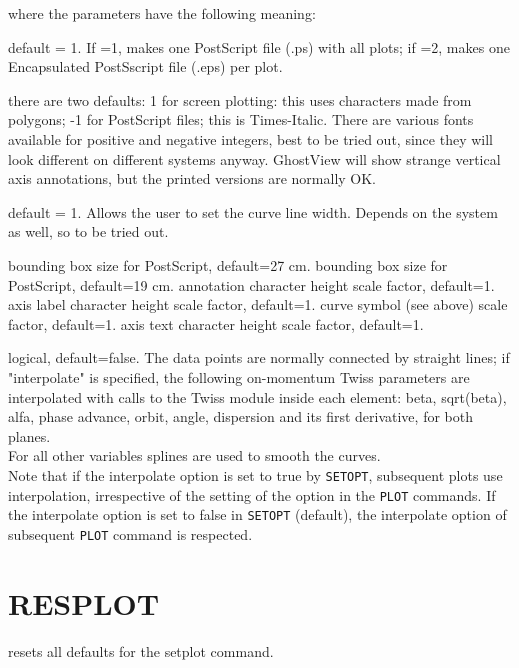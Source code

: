 where the parameters have the following meaning: 
\begin{madlist}
    default = 1. If =1, makes one PostScript file (.ps) with
     all plots; if =2, makes one Encapsulated PostSscript file (.eps)
     per plot.   

    there are two defaults: 1 for screen plotting: this uses
     characters made from polygons; -1 for PostScript files; this is
     Times-Italic. There are various fonts available for positive and
     negative integers, best to be tried out, since they will look
     different on different systems anyway. GhostView will show strange
     vertical axis annotations, but the printed versions are normally
     OK.   

    default = 1. Allows the user to set the curve line
     width.  Depends on the system as well, so to be tried out.   

    bounding box size for PostScript, default=27 cm.   
    bounding box size for PostScript, default=19 cm.   
    annotation character height scale factor, default=1.   
    axis label character height scale factor, default=1.  
    curve symbol (see above) scale factor, default=1.  
    axis text character height scale factor, default=1.  

    logical, default=false. The data points are
     normally connected by straight lines; if "interpolate" is
     specified, the following on-momentum Twiss parameters are
     interpolated with calls to the Twiss module inside 
     each element:  beta, sqrt(beta), alfa, phase advance, orbit, angle,
     dispersion and its first derivative, for both planes. \\ 
     For all other variables splines are used to smooth the curves. \\  
     Note that if the interpolate option is set to true by \texttt{SETOPT},
     subsequent plots use interpolation, irrespective of the
     setting of the option in the \texttt{PLOT} commands. If the interpolate
     option is set to false in \texttt{SETOPT} (default), the interpolate
     option of subsequent \texttt{PLOT} command is respected.

\end{madlist}


\section{RESPLOT}
\label{sec:resplot}
resets all defaults for the setplot command.  


